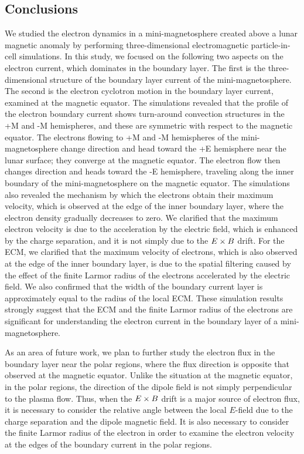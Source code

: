\documentclass[draft,jgrga]{agutex2015}
\begin{document}
\begin{article}
\section{Conclusions}
We studied the electron dynamics in 
a mini-magnetosphere created above a lunar magnetic anomaly
by performing three-dimensional electromagnetic particle-in-cell simulations.
In this study, we focused on the following two aspects on the
electron current, which dominates in the boundary layer.
The first is the three-dimensional structure of 
the boundary layer current of the mini-magnetosphere. 
The second is the electron cyclotron motion 
in the boundary layer current, examined at the magnetic equator.
The simulations revealed that the profile of 
the electron boundary current shows 
turn-around convection structures 
in the +M and -M hemispheres, and these are symmetric with respect to the magnetic equator.
The electrons flowing to +M and -M hemispheres 
of the mini-magnetosphere
change direction and head toward the +E hemisphere 
near the lunar surface; they converge at the magnetic equator. 
The electron flow then changes direction and heads toward the -E hemisphere, 
traveling along the inner boundary of the mini-magnetosphere on the magnetic equator.
The simulations also revealed the mechanism by which the electrons obtain their maximum velocity, which is
observed at the edge of the inner boundary layer,
where the electron density gradually decreases to zero.
We clarified that the maximum electron velocity
is due to the acceleration by the electric field, which is
enhanced by the charge separation, and it is 
not simply due to the $\mbox{\boldmath $E$} \times \mbox{\boldmath $B$}$ drift.
For the ECM, we clarified that 
the maximum velocity of electrons, which is also observed 
at the edge of the inner boundary layer, is due to 
the spatial filtering caused by 
the effect of the finite Larmor radius of the electrons 
accelerated by the electric field.
We also confirmed that the width of the boundary current layer 
is approximately equal to the radius of the local ECM.
These simulation results strongly suggest that the 
ECM and the finite Larmor radius of the electrons are significant 
for understanding the electron current in the boundary layer of a mini-magnetosphere. 

As an area of future work, 
we plan to further study the electron flux in the boundary layer 
near the polar regions, where the flux direction is opposite 
that observed at the magnetic equator.
Unlike the situation at the magnetic equator, in the polar regions,
the direction of the dipole field is not simply 
perpendicular to the plasma flow. 
Thus, when
the $\mbox{\boldmath $E$} \times \mbox{\boldmath $B$}$ drift 
is a major source of electron flux, it is necessary to consider the relative angle between
the local $E$-field due to the charge separation and 
the dipole magnetic field.
It is also necessary to consider the finite Larmor radius 
of the electron in order to examine the electron velocity 
at the edges of the boundary current in the polar regions.


\end{article}
\end{document}
